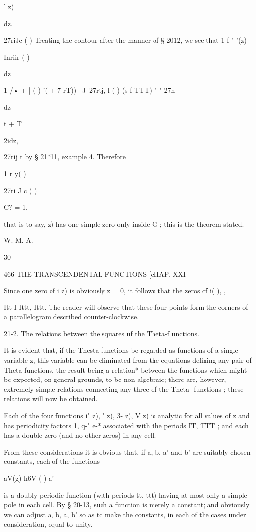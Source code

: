  ' z)

dz.

27riJc ( ) Treating the contour after the manner of § 2012, we see
that 1 f " '(z)

Inriir ( )

dz

1 /• +-| ( ) '( + 7 rT)) \ J\ 27rtj, l ( ) (s-f-TTT) " " 27n

dz

t + T

2idz,

27rij t by § 21*11, example 4. Therefore

1 r y( )

27ri J c ( )

C? = 1,

that is to say, z) has one simple zero only inside G ; this is the
theorem stated.

W. M. A.

30

466 THE TRANSCENDENTAL FUNCTIONS [cHAP. XXI

Since one zero of i z) is obviously z = 0, it follows that the zeros
of i( ), %
,

Itt-I-Ittt, Ittt. The reader will observe that these four points form
the corners of a parallelogram described counter-clockwise.

21-2. The relations between the squares uf the Theta-f unctions.

It is evident that, if the Thcsta-functions be regarded as functions
of a single variable z, this variable can be eliminated from the
equations defining any pair of Theta-functions, the result being a
relation* between the functions which might be expected, on general
grounds, to be non-algebraic; there are, however, extremely simple
relations connecting any three of the Theta- functions ; these
relations will now be obtained.

Each of the four functions i" z), " z), 3- z), V z) is analytic for
all values of z and has periodicity factors 1, q-" e-* associated with
the periods IT, TTT ; and each has a double zero (and no other zeros)
in any cell.

From these considerations it is obvious that, if a, b, a' and b' are
suitably chosen constants, each of the functions

aV(g)-h6V ( ) a'%

is a doubly-periodic function (with periods tt, ttt) having at most
only a simple pole in each cell. By § 20-13, such a function is merely
a constant; and obviously we can adjust a, b, a, b' so as to make the
constants, in each of the cases under consideration, equal to unity.

